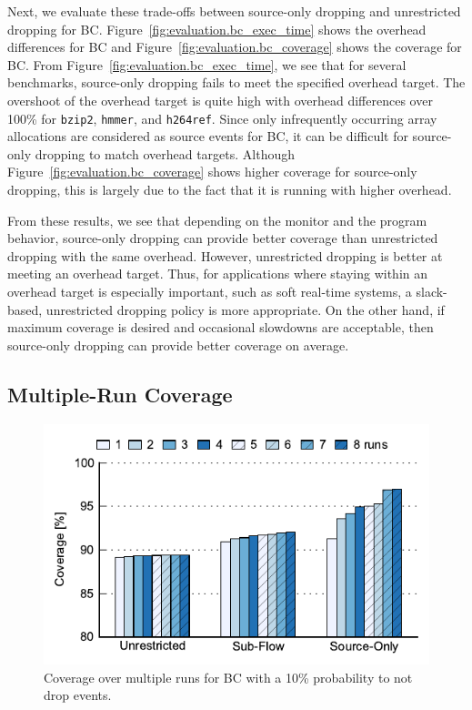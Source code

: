 Next, we evaluate these trade-offs between source-only dropping and unrestricted dropping for BC.
Figure~\ref{fig:evaluation.bc_exec_time} shows the overhead differences for BC
and Figure~\ref{fig:evaluation.bc_coverage} shows the coverage for BC.
From Figure~\ref{fig:evaluation.bc_exec_time}, we see that for several
benchmarks, source-only dropping fails to meet the specified overhead target.
The overshoot of the overhead target is quite high with overhead differences over 100\% for {\tt bzip2}, {\tt hmmer}, and {\tt h264ref}.
Since only infrequently occurring array allocations are considered as source events for BC, it can be 
difficult for source-only dropping to match overhead targets. Although
Figure~\ref{fig:evaluation.bc_coverage} shows higher coverage for
source-only dropping, this is largely due to the fact that it is running with
higher overhead.

From these results, we see that depending on the monitor and the program
behavior, source-only dropping can provide better coverage than unrestricted
dropping with the same overhead. However, unrestricted dropping is better at
meeting an overhead target.
Thus, for applications where staying within an overhead target is especially
important, such as soft real-time systems, a slack-based, unrestricted dropping
policy is more appropriate. On the other hand, if maximum coverage is desired
and occasional slowdowns are acceptable, then source-only dropping can provide
better coverage on average.

\subsection{Multiple-Run Coverage}

\begin{figure}
  \begin{center}
    \includegraphics[width=\columnwidth]{figs/data_multirun_coverage.pdf}
    \vspace{-0.3in}
    \caption{Coverage over multiple runs for BC with a 10\% probability to not drop events.}
    \label{fig:evaluation.multirun}
    \vspace{-0.3in}
  \end{center}
\end{figure}

